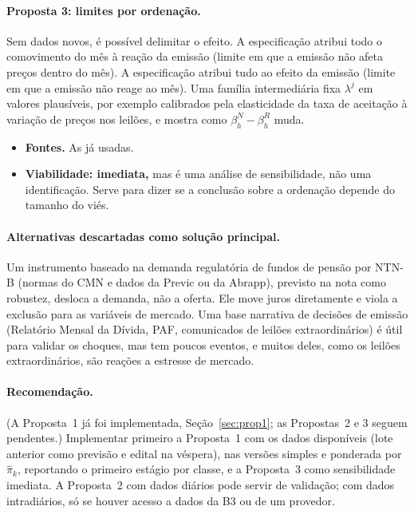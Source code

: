 \documentclass[12pt,a4paper]{article}
\begin{document}
\paragraph{Proposta 3: limites por ordenação.}
Sem dados novos, é possível delimitar o efeito. A especificação 
atribui todo o comovimento do mês à reação da emissão (limite em que a emissão não
afeta preços dentro do mês). A especificação  atribui tudo ao efeito da
emissão (limite em que a emissão não reage ao mês). Uma família intermediária
fixa \(\lambda^j\) em valores plausíveis, por exemplo calibrados pela elasticidade
da taxa de aceitação à variação de preços nos leilões, e mostra como
\(\beta_h^{N}-\beta_h^{R}\) muda.
\begin{itemize}[leftmargin=1.2cm]
    \item \textbf{Fontes.} As já usadas.
    \item \textbf{Viabilidade: imediata,} mas é uma análise de sensibilidade, não uma
    identificação. Serve para dizer se a conclusão sobre a ordenação depende do
    tamanho do viés.
\end{itemize}

\paragraph{Alternativas descartadas como solução principal.} Um instrumento baseado
na demanda regulatória de fundos de pensão por NTN-B (normas do CMN e dados da
Previc ou da Abrapp), previsto na nota como robustez, desloca a demanda, não a
oferta. Ele move juros diretamente e viola a exclusão para as variáveis de
mercado. Uma base narrativa de decisões de emissão (Relatório Mensal da Dívida,
PAF, comunicados de leilões extraordinários) é útil para validar os choques, mas
tem poucos eventos, e muitos deles, como os leilões extraordinários, são reações a
estresse de mercado.

\paragraph{Recomendação.} (A Proposta~1 já foi implementada,
Seção~\ref{sec:prop1}; as Propostas~2 e 3 seguem pendentes.) Implementar primeiro a Proposta~1 com os dados disponíveis
(lote anterior como previsão e edital na véspera), nas versões simples e ponderada
por \(\hat\pi_k\), reportando o primeiro estágio por classe, e a Proposta~3 como
sensibilidade imediata. A Proposta~2 com dados diários
pode servir de validação; com dados intradiários, só se houver acesso a dados da B3
ou de um provedor.
\end{document}
